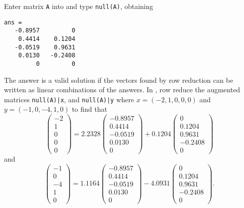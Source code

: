 \documentclass{ximera}
\begin{document}
\begin{exercise}
\begin{solution}
Enter matrix {\tt A} into \Matlab and type {\tt null(A)}, obtaining
\begin{verbatim}
ans =
   -0.8957         0
    0.4414    0.1204
   -0.0519    0.9631
    0.0130   -0.2408
         0         0
\end{verbatim}
The \Matlab answer is a valid solution if the vectors found
by row reduction can be written as linear combinations of the \Matlab
answers.  In \Matlab, row reduce the augmented matrices {\tt null(A)|x},
and {\tt null(A)|y} where $x = (-2,1,0,0,0)$ and $y = (-1,0,-4,1,0)$ 
to find that
\[
\left(\begin{array}{r} -2 \\ 1 \\ 0 \\ 0 \\ 0 \end{array}\right) =
2.2328\left(\begin{array}{r} -0.8957 \\ 0.4414 \\ -0.0519 \\ 0.0130 \\ 0
\end{array}\right) + 0.1204\left(\begin{array}{r} 0 \\ 0.1204 \\ 0.9631 \\
-0.2408 \\ 0 \end{array}\right)
\]
and
\[
\left(\begin{array}{r} -1 \\ 0 \\ -4 \\ 1 \\ 0 \end{array}\right) =
1.1164\left(\begin{array}{r} -0.8957 \\ 0.4414 \\ -0.0519 \\ 0.0130 \\ 0
\end{array}\right) - 4.0931\left(\begin{array}{r} 0 \\ 0.1204 \\ 0.9631 \\
-0.2408 \\ 0 \end{array}\right).
\]


\end{solution}
\end{exercise}
\end{document}

